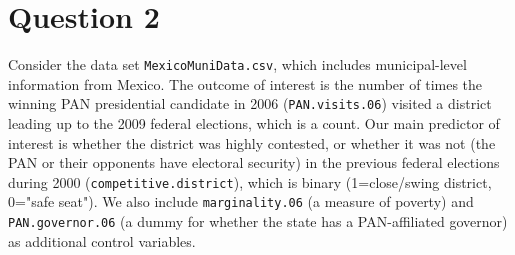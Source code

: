 \documentclass[12pt,letterpaper]{article}
\begin{document}
\section*{Question 2} 
\vspace{.25cm}

\noindent Consider the data set \texttt{MexicoMuniData.csv}, which includes municipal-level information from Mexico. The outcome of interest is the number of times the winning PAN presidential candidate in 2006 (\texttt{PAN.visits.06}) visited a district leading up to the 2009 federal elections, which is a count. Our main predictor of interest is whether the district was highly contested, or whether it was not (the PAN or their opponents have electoral security) in the previous federal elections during 2000 (\texttt{competitive.district}), which is binary (1=close/swing district, 0="safe seat"). We also include \texttt{marginality.06} (a measure of poverty) and \texttt{PAN.governor.06} (a dummy for whether the state has a PAN-affiliated governor) as additional control variables. 
\end{document}
